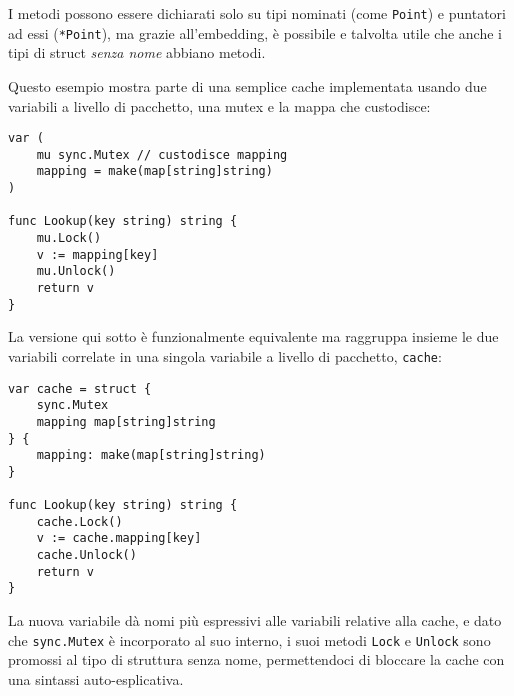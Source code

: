 \documentclass[../../thesis.tex]{subfiles}
\begin{document}
    I metodi possono essere dichiarati solo su tipi nominati (come \verb"Point") e puntatori ad essi (\verb"*Point"), ma grazie all'embedding, è possibile e talvolta utile che anche i tipi di struct \textit{senza nome} abbiano metodi.
    \hfill \vspace{12pt}

    Questo esempio mostra parte di una semplice cache implementata usando due variabili a livello di pacchetto, una mutex e la mappa che custodisce:
    \begin{lstlisting}[frame = single,label={lst:lstlisting5-3.8}]
var (
    mu sync.Mutex // custodisce mapping
    mapping = make(map[string]string)
)

func Lookup(key string) string {
    mu.Lock()
    v := mapping[key]
    mu.Unlock()
    return v
}
    \end{lstlisting}
    La versione qui sotto è funzionalmente equivalente ma raggruppa insieme le due variabili correlate in una singola variabile a livello di pacchetto, \verb"cache":
    \begin{lstlisting}[frame = single,label={lst:lstlisting5-3.9}]
var cache = struct {
    sync.Mutex
    mapping map[string]string
} {
    mapping: make(map[string]string)
}

func Lookup(key string) string {
    cache.Lock()
    v := cache.mapping[key]
    cache.Unlock()
    return v
}
    \end{lstlisting}
    La nuova variabile dà nomi più espressivi alle variabili relative alla cache, e dato che \verb"sync.Mutex" è incorporato al suo interno, i suoi metodi \verb"Lock" e \verb"Unlock" sono promossi al tipo di struttura senza nome, permettendoci di bloccare la cache con una sintassi auto-esplicativa.
\end{document}
